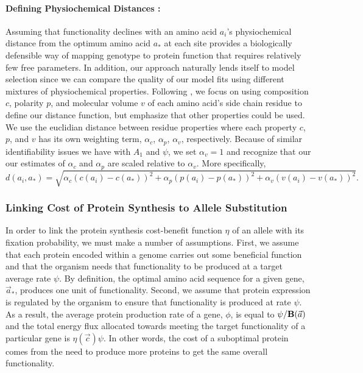 \documentclass{article}
\newcommand{\Func}{\ensuremath{\text{\textbf{B}}}\xspace}
\newcommand{\alphac}{\ensuremath{\alpha_c}\xspace}
\newcommand{\alphap}{\ensuremath{\alpha_p}\xspace}
\newcommand{\alphav}{\ensuremath{\alpha_v}\xspace}
\newcommand{\aopt}{\ensuremath{a_*}\xspace}
\newcommand{\aoptvec}{\ensuremath{\Vec{a}_*}\xspace}
\newcommand{\avec}{\ensuremath{\Vec{a}}\xspace}
\newcommand{\cvec}{\ensuremath{\Vec{c}}\xspace}
\begin{document}
\paragraph*{Defining Physiochemical Distances :}
Assuming that functionality declines with an amino acid $a_i$'s physiochemical distance from the optimum amino acid \aopt at each site  provides a biologically defensible way of mapping genotype to protein function that requires relatively few free parameters.
In addition, our approach naturally lends itself to model selection since we can compare the quality of our model fits using different mixtures of physiochemical properties.
Following \citet{Grantham1974}, we focus on using composition $c$, polarity $p$, and molecular volume $v$ of each amino acid's side chain residue to define our distance function, but emphasize that other properties could be used.
We use the euclidian distance between residue properties where each property $c$, $p$, and $v$ has its own weighting term, $\alphac$, $\alphap$, $\alphav$, respectively.
Because of similar identifiability issues we have with $A_1$ and $\psi$, we set $\alphav = 1$ and recognize that our our estimates of $\alphac$ and $\alphap$ are scaled relative to $\alphav$.
More specifically,
\begin{equation*}
  d(a_i, \aopt) = \sqrt{\alphac \left(c\left(a_i\right) - c\left(\aopt\right)\right)^2 + \alphap \left(p\left(a_i\right) - p\left(\aopt\right)\right)^2 +  \alphav \left(v\left(a_i\right) - v\left(\aopt\right)\right)^2}.
\end{equation*}


\subsubsection*{Linking Cost of Protein Synthesis to Allele Substitution}
In order to link the protein synthesis cost-benefit function $\eta$ of an allele with its fixation probability, we must make a number of assumptions.
First, we assume that each protein encoded within a genome carries out some beneficial function and that the organism needs that functionality to be produced at a target average rate $\psi$.
By definition, the optimal amino acid sequence for a given gene, \aoptvec, produces one unit of functionality.
Second, we assume that protein expression is regulated by the organism to ensure that functionality is produced at rate $\psi$.
As a result, the average protein production rate of a gene, $\phi$, is equal to $\psi/\Func(\avec)$ and the total energy flux allocated towards meeting the target functionality of a particular gene is $\eta(\cvec) \psi$. 
In other words, the cost of a suboptimal protein comes from the need to produce more proteins to get the same overall functionality.
\end{document}

